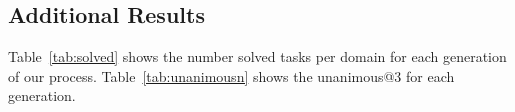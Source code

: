 \subsection{Additional Results}
\label{sec:extra-exps}




Table~\ref{tab:solved} shows the number solved tasks per domain for each
generation of our process. Table~\ref{tab:unanimousn} shows the unanimous@3 for
each generation.

